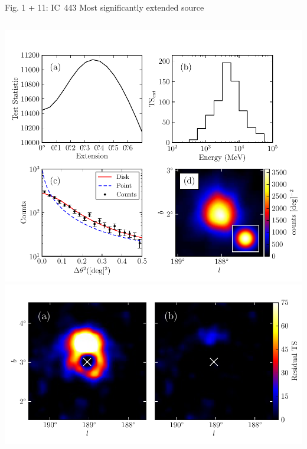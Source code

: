 \documentclass[12pt]{beamer}
\begin{document}
\begin{frame}{Fig. 1 + 11: IC~443}
  Most significantly extended source
  \begin{columns}
    \includegraphics[scale=0.35]{plots/four_plots_ic443_color.pdf}
  \includegraphics[scale=0.35]{plots/res_tsmap_ic443_color.pdf}
  \end{columns}
\end{frame}
\end{document}
